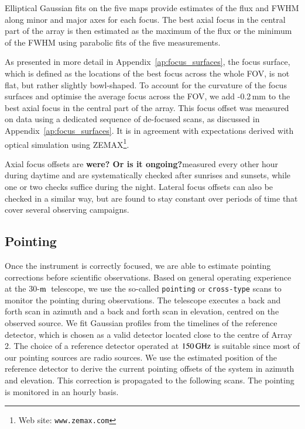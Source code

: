 \documentclass[traditionalabstract]{aa}
\newcommand{\trentemetre}{30-$\rm{m}$}
\newcommand{\lp}[1]{#1}
\newcommand{\LEt}[1]{{\bf {\color[RGB]{0, 153, 255} #1}}}
\begin{document}
Elliptical Gaussian fits on the five maps provide estimates of
the flux and FWHM along minor and major axes for each focus. 
The best axial focus in the central part of the array is then
estimated as the maximum of the flux or the minimum of the FWHM using
parabolic fits of the five measurements.

As presented in more detail in Appendix~\ref{ap:focus_surfaces}, the focus
surface, which is defined as the locations of the best focus across the whole FOV,
is not flat, but rather slightly bowl-shaped.
To account for the curvature of the focus surfaces and optimise the
average focus across the FOV, we add -0.2\,mm to the best axial focus
in the central part of the array. This focus offset was measured on data using
a dedicated sequence of de-focused scans, as discussed in
Appendix~\ref{ap:focus_surfaces}. It is in agreement with expectations
derived with optical simulation using ZEMAX\footnote{Web site: \tt{www.zemax.com}}. 

{\lp Axial focus offsets are \LEt{were? Or is it ongoing?}measured every other hour during daytime and
are systematically checked after sunrises and sunsets, while one or
two checks suffice during the night. 
Lateral focus offsets can also be checked in a similar way, but are
found to stay constant over periods of time that cover several
observing campaigns.}


\subsection{Pointing}
\label{se:pointing}

Once the instrument is correctly focused, we are able to %
estimate pointing corrections before scientific observations.
Based on general operating experience at the \trentemetre\ telescope, we use the so-called
{\tt pointing} or {\tt cross-type} scans to monitor the pointing during observations. The
telescope executes a back and forth scan in azimuth and a back and forth scan in
elevation, centred on the observed source. We fit Gaussian profiles
from the timelines of the reference detector, which is chosen as a
valid detector located close to the centre of Array 2. {The choice of
a reference detector operated at $150\,\rm{GHz}$ is suitable since most
of our pointing sources are radio sources.} We use the
estimated position of the reference detector to derive the current pointing
offsets of the system in azimuth and elevation. This correction is
propagated to the following scans. The pointing is monitored in an
hourly basis.
\end{document}
